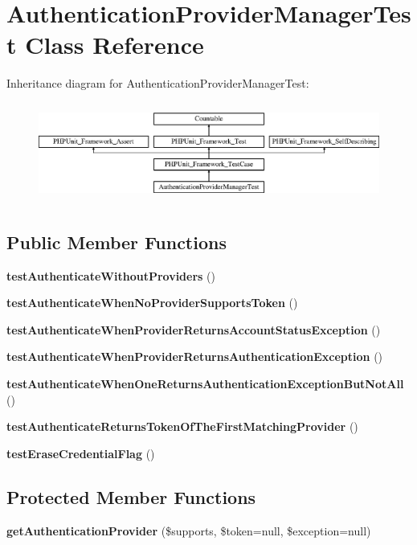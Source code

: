 \section{Authentication\+Provider\+Manager\+Test Class Reference}
\label{class_symfony_1_1_component_1_1_security_1_1_core_1_1_tests_1_1_authentication_1_1_authentication_provider_manager_test}
Inheritance diagram for Authentication\+Provider\+Manager\+Test\+:\begin{figure}[H]
\begin{center}
\leavevmode
\includegraphics[height=3.303835cm]{class_symfony_1_1_component_1_1_security_1_1_core_1_1_tests_1_1_authentication_1_1_authentication_provider_manager_test}
\end{center}
\end{figure}
\subsection*{Public Member Functions}
\begin{DoxyCompactItemize}
\item 
{\bf test\+Authenticate\+Without\+Providers} ()
\item 
{\bf test\+Authenticate\+When\+No\+Provider\+Supports\+Token} ()
\item 
{\bf test\+Authenticate\+When\+Provider\+Returns\+Account\+Status\+Exception} ()
\item 
{\bf test\+Authenticate\+When\+Provider\+Returns\+Authentication\+Exception} ()
\item 
{\bf test\+Authenticate\+When\+One\+Returns\+Authentication\+Exception\+But\+Not\+All} ()
\item 
{\bf test\+Authenticate\+Returns\+Token\+Of\+The\+First\+Matching\+Provider} ()
\item 
{\bf test\+Erase\+Credential\+Flag} ()
\end{DoxyCompactItemize}
\subsection*{Protected Member Functions}
\begin{DoxyCompactItemize}
\item 
{\bf get\+Authentication\+Provider} (\$supports, \$token=null, \$exception=null)
\end{DoxyCompactItemize}
